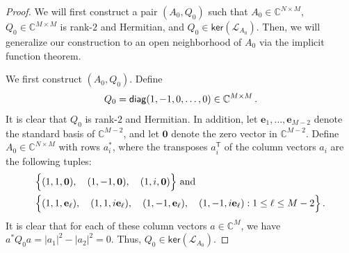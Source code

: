\documentclass[11pt,reqno]{amsart}
\begin{document}
\begin{proof}
We will first construct a pair $(A_0,Q_0)$ such that $A_0 \in \mathbb C^{N\times M}$, $Q_0 \in \mathbb C^{M\times M}$ is rank-$2$ and Hermitian, and $Q_0 \in \mathsf{ker}(\mathcal L_{A_0})$. Then, we will generalize our construction to an open neighborhood of $A_0$ via the implicit function theorem.

We first construct $(A_0,Q_0)$. Define
\begin{equation}{\label{eq:def-Q-0}}
    Q_0 = \mathsf{diag}(1,-1,0,\ldots,0) \in \mathbb C^{M \times M} \,.
\end{equation}
It is clear that $Q_0$ is rank-$2$ and Hermitian. In addition, let $\mathbf e_1,\ldots,\mathbf e_{M-2}$ denote the standard basis of $\mathbb C^{M-2}$, and let $\mathbf 0$ denote the zero vector in $\mathbb C^{M-2}$. Define $A_0\in\mathbb C^{N\times M}$ with rows $a_i^*$, where the transposes $a_i^{\mathsf T}$ of the column vectors $a_i$ are the following tuples:
\begin{equation}{\label{eq:def-A-0}}
    \begin{aligned}
        &\Big\{ (1,1,\mathbf 0), \quad (1,-1,\mathbf 0), \quad (1,i,\mathbf 0) \Big\} \mbox{ and } \\
        &\Big\{ (1,1,\mathbf e_\ell), \quad (1,1,i\mathbf e_\ell), \quad (1,-1,\mathbf e_\ell), \quad (1,-1,i\mathbf e_\ell): 1 \leq \ell \leq M-2 \Big\} \,.
    \end{aligned}
\end{equation}
It is clear that for each of these column vectors $a\in \mathbb C^M$, we have $a^* Q_0 a=|a_1|^2-|a_2|^2=0$. Thus, $Q_0 \in \mathsf{ker}(\mathcal L_{A_0})$.


\end{proof}
\end{document}
